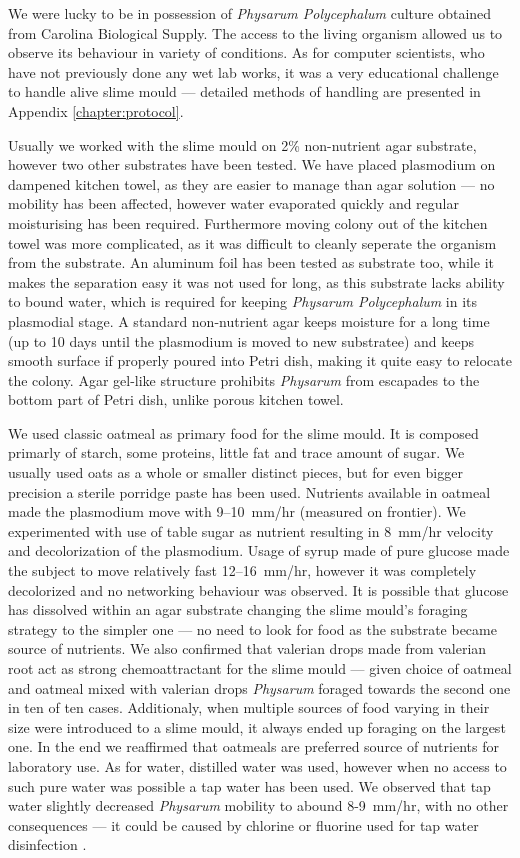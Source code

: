 We were lucky to be in possession of \textit{Physarum Polycephalum} culture obtained from Carolina Biological Supply. The access to the living organism allowed us to observe its behaviour in variety of conditions. As for computer scientists, who have not previously done any wet lab works, it was a very educational challenge to handle alive slime mould --- detailed methods of handling are presented in Appendix \ref{chapter:protocol}.

Usually we worked with the slime mould on 2\% non-nutrient agar substrate, however two other substrates have been tested. We have placed plasmodium on dampened kitchen towel, as they are easier to manage than agar solution --- no mobility has been affected, however water evaporated quickly and regular moisturising has been required. Furthermore moving colony out of the kitchen towel was more complicated, as it was difficult to cleanly seperate the organism from the substrate. An aluminum foil has been tested as substrate too, while it makes the separation easy it was not used for long, as this substrate lacks ability to bound water, which is required for keeping \textit{Physarum Polycephalum} in its plasmodial stage. A standard non-nutrient agar keeps moisture for a long time (up to 10 days until the plasmodium is moved to new substratee) and keeps smooth surface if properly poured into Petri dish, making it quite easy to relocate the colony. Agar gel-like structure prohibits \textit{Physarum} from escapades to the bottom part of Petri dish, unlike porous kitchen towel. 

We used classic oatmeal as primary food for the slime mould. It is composed primarly of starch, some proteins, little fat and trace amount of sugar. We usually used oats as a whole or smaller distinct pieces, but for even bigger precision a sterile porridge paste has been used. Nutrients available in oatmeal made the plasmodium move with 9--10~mm/hr (measured on frontier). We experimented with use of table sugar as nutrient resulting in 8~mm/hr velocity and decolorization of the plasmodium. Usage of syrup made of pure glucose made the subject to move relatively fast 12--16~mm/hr, however it was completely decolorized and no networking behaviour was observed. It is possible that glucose has dissolved within an agar substrate changing the slime mould's foraging strategy to the simpler one --- no need to look for food as the substrate became source of nutrients. We also confirmed that valerian drops made from valerian root act as strong chemoattractant for the slime mould \cite{adamatzky2012physarum} --- given choice of oatmeal and oatmeal mixed with valerian drops \textit{Physarum} foraged towards the second one in ten of ten cases. Additionaly, when multiple sources of food varying in their size were introduced to a slime mould, it always ended up foraging on the largest one. In the end we reaffirmed that oatmeals are preferred source of nutrients for laboratory use. As for water, distilled water was used, however when no access to such pure water was possible a tap water has been used. We observed that tap water slightly decreased \textit{Physarum} mobility to abound 8-9~mm/hr, with no other consequences --- it could be caused by chlorine or fluorine used for tap water disinfection \cite{uden1983chlorinated}.

